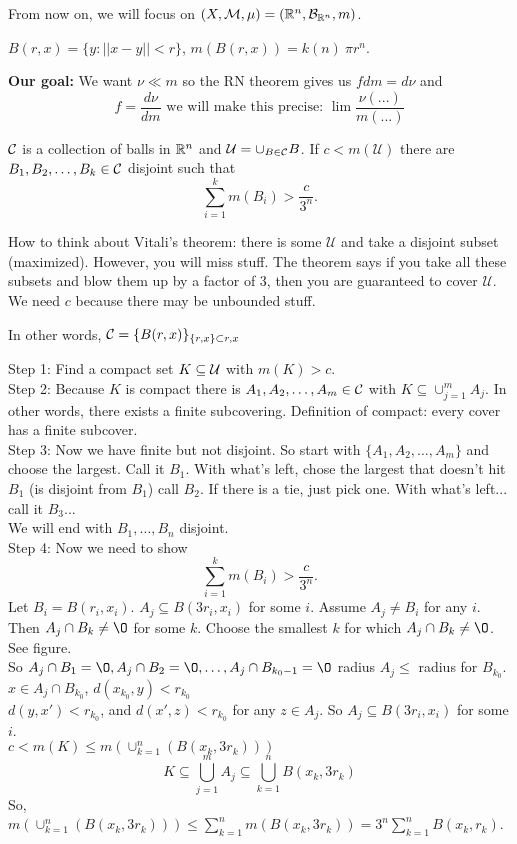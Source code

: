 \begin{rmk}
From now on, we will focus on $(X, {\mathcal M}, \mu)= ({\mathbb R}^n, {\mathcal B}_{{\mathbb R}^n}, m)$. 	
\end{rmk}
\begin{rmk}
$B(r, x) = \{ y : ||x - y||<r \}$, $m(B(r,x))= k(n) \ \pi r^n$.	
\end{rmk}
\textbf{Our goal: }We want $\nu \ll m$ so the RN theorem gives us $f d m = d \nu$ and \[
f = \frac{d \nu}{d m} \text{ we will make this precise: } \lim \frac{\nu(...)}{m(...)}
\]
\begin{lem}
	${\mathcal C}$ is a collection of balls in ${\mathbb R}^n$ and $\mathcal U = \cup_{B \in {\mathcal C}} B$. If $c< m(\mathcal U)$ there are $B_1, B_2, \dots, B_k \in {\mathcal C}$ disjoint such that 
	\[
	\sum_{i=1}^k m(B_i) > \frac{c}{3^n}.
	\]
\end{lem}
How to think about Vitali's theorem: there is some $\mathcal U$ and take a disjoint subset (maximized). However, you will miss stuff. The theorem says if you take all these subsets and blow them up by a factor of 3, then you are guaranteed to cover $\mathcal U$. \\
We need $c$ because there may be unbounded stuff.
\begin{rmk}
In other words, ${\mathcal C} = \{ B(r,x) \}_{\{r,x\} \subset r,x}$	
\end{rmk}

\begin{pf}
Step 1: Find a compact set $K \subseteq {\mathcal U}$ with 	$m(K) > c$. \\
Step 2: Because $K$ is compact there is $A_1, A_2, \dots, A_m \in {\mathcal C}$ with $K \subseteq \cup_{j=1}^m A_j$. In other words, there exists a finite subcovering. Definition of compact: every cover has a finite subcover. \\
Step 3: Now we have finite but not disjoint. So start with $\{A_1, A_2, \dots, A_m \}$ and choose the largest. Call it $B_1$. With what's left, chose the largest that doesn't hit $B_1$ (is disjoint from $B_1$) call $B_2$. If there is a tie, just pick one. With what's left... call it $B_3$...\\
We will end with $B_1, \dots, B_n$ disjoint. \\
Step 4: Now we need to show 
\[
	\sum_{i=1}^k m(B_i) > \frac{c}{3^n}.
	\]
	Let $B_i = B(r_i, x_i)$. $A_j \subseteq B(3r_i, x_i)$ for some $i$. Assume $A_j \neq B_i$ for any $i$. Then $A_j \cap B_k \neq \O$ for some $k$. Choose the smallest $k$ for which $A_j \cap B_k \neq \O$. 
	See figure. \\
	So $A_j \cap B_1 = \O, A_j \cap B_2 = \O, \dots, A_j \cap B_{k_0 -1}= \O$ radius $A_j \leq $ radius for $B_{k_0}$.
	$x \in A_j \cap B_{k_0}$, $d(x_{k_0}, y)< r_{k_0}$\\
	$d(y, x')< r_{k_0}$, and $d(x', z) < r_{k_0}$ for any $z \in A_j$. So $A_j \subseteq B(3r_i, x_i)$ for some $i$. \\
	$c < m(K) \leq m(\cup_{k=1}^n(B(x_k, 3r_k)))$
	\[
	K \subseteq \bigcup_{j=1}^m A_j \subseteq \bigcup_{k=1}^n B(x_k, 3r_k)
	\]
	So, $m(\cup_{k=1}^n(B(x_k, 3r_k))) \leq \sum_{k=1}^n m (B(x_k, 3r_k))=3^n \sum_{k=1}^n B(x_k, r_k)$. 
\end{pf}

